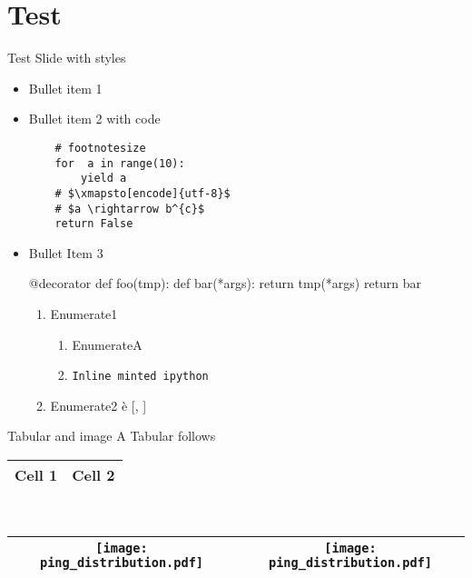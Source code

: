 
\section{Test}

\begin{frame}[fragile]{Test Slide with styles}
\begin{itemize}
\item Bullet item 1
\item Bullet item 2 with code
\begin{verbatim}
    # footnotesize
    for  a in range(10):
        yield a
    # $\xmapsto[encode]{utf-8}$
    # $a \rightarrow b^{c}$
    return False
\end{verbatim}
\item Bullet Item 3
\begin{pythoncode}
@decorator
def foo(tmp):
    def bar(*args):
        return tmp(*args)
    return bar
\end{pythoncode}
\begin{enumerate}
\item Enumerate1
    \begin{enumerate}
    \item EnumerateA
    \item \texttt{Inline minted ipython}
    \end{enumerate}

\item Enumerate2 \`{e} 
 [, ] 

\end{enumerate}
\end{itemize}

\end{frame}

\begin{frame}[fragile]{Tabular and image}
A Tabular follows \\
\begin{tabular}{|c|c|}\hline
Cell 1 & Cell 2 \\
\hline 
\end{tabular}
\\
\begin{table}
\begin{tabular}{|c|c|}\hline
\texttt{[image: ping\_distribution.pdf]}   & \texttt{[image: ping\_distribution.pdf]}  \\
\hline 
\end{tabular}
\end{table}
\end{frame}

